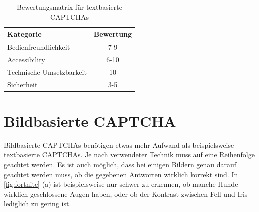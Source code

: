 \begin{table}[h!]
    \caption{Bewertungsmatrix für textbasierte CAPTCHAs}
    \begin{center}
        \begin{tabular}{l|c}
            Kategorie                       & Bewertung \\\hline
            Bedienfreundlichkeit            & 7-9         \\
            Accessibility                   & 6-10        \\
            Technische Umsetzbarkeit        & 10         \\
            Sicherheit                      & 3-5         
        \end{tabular}
    \end{center}
    \label{table:matrix:text}
\end{table}

\section{Bildbasierte CAPTCHA}
\label{ch:bewertung:bild}
Bildbasierte CAPTCHAs benötigen etwas mehr Aufwand als beispielsweise textbasierte CAPTCHAs.
Je nach verwendeter Technik muss auf eine Reihenfolge geachtet werden. 
Es ist auch möglich, dass bei einigen Bildern genau darauf geachtet werden muss, ob die gegebenen Antworten wirklich korrekt sind.
In \autoref{fig:fortnite} (a) ist beispielsweise nur schwer zu erkennen, ob manche Hunde wirklich geschlossene Augen haben, 
oder ob der Kontrast zwischen Fell und Iris lediglich zu gering ist.

